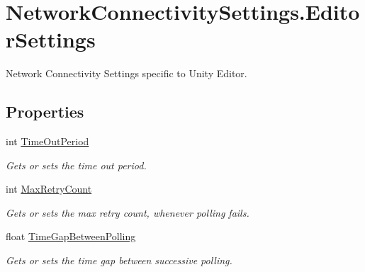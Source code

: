 \hypertarget{class_voxel_busters_1_1_native_plugins_1_1_network_connectivity_settings_1_1_editor_settings}{}\section{Network\+Connectivity\+Settings.\+Editor\+Settings}
\label{class_voxel_busters_1_1_native_plugins_1_1_network_connectivity_settings_1_1_editor_settings}


Network Connectivity Settings specific to Unity Editor.  


\subsection*{Properties}
\begin{DoxyCompactItemize}
\item 
int \hyperlink{class_voxel_busters_1_1_native_plugins_1_1_network_connectivity_settings_1_1_editor_settings_aa042f2d5922ed5672d29246b911e1933}{Time\+Out\+Period}
\begin{DoxyCompactList}\small\item\em Gets or sets the time out period. \end{DoxyCompactList}\item 
int \hyperlink{class_voxel_busters_1_1_native_plugins_1_1_network_connectivity_settings_1_1_editor_settings_af1774f57b5887760a799da4e3962d1a3}{Max\+Retry\+Count}
\begin{DoxyCompactList}\small\item\em Gets or sets the max retry count, whenever polling fails. \end{DoxyCompactList}\item 
float \hyperlink{class_voxel_busters_1_1_native_plugins_1_1_network_connectivity_settings_1_1_editor_settings_a71f51bc367fbee9216f67fa85052ed99}{Time\+Gap\+Between\+Polling}
\begin{DoxyCompactList}\small\item\em Gets or sets the time gap between successive polling. \end{DoxyCompactList}\end{DoxyCompactItemize}


